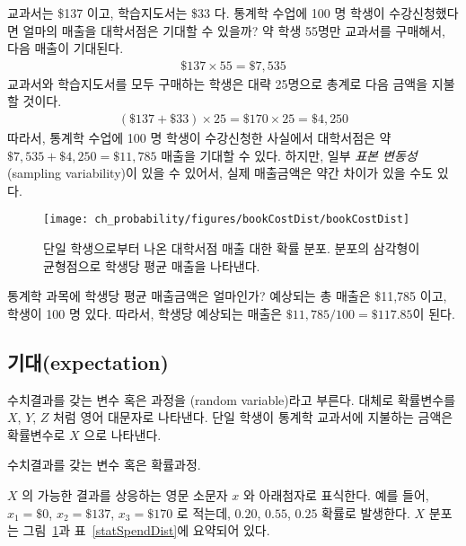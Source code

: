 \begin{example}{교과서는 \$137 이고, 학습지도서는 \$33 다. 통계학 수업에 100 명 학생이 수강신청했다면 얼마의 매출을 대학서점은 기대할 수 있을까?}\label{bookStoreRev}
약 학생 55명만 교과서를 구매해서, 다음 매출이 기대된다.
\begin{eqnarray*}
\$137 \times  55 = \$7,535
\end{eqnarray*}
교과서와 학습지도서를 모두 구매하는 학생은 대략 25명으로 총계로 다음 금액을 지불할 것이다.
\begin{eqnarray*}
(\$137 + \$33) \times  25 = \$170 \times  25 = \$4,250
\end{eqnarray*}
따라서, 통계학 수업에 100 명 학생이 수강신청한 사실에서 대학서점은 약 $\$7,535 + \$4,250 = \$11,785$ 매출을 기대할 수 있다. 하지만, 
일부 \emph{표본 변동성}(sampling variability)이 있을 수 있어서, 실제 매출금액은 약간 차이가 있을 수도 있다.
\end{example}

\begin{figure}[h]
\centering
\texttt{[image: ch\_probability/figures/bookCostDist/bookCostDist]}
\caption{단일 학생으로부터 나온 대학서점 매출 대한 확률 분포. 분포의 삼각형이 균형점으로 학생당 평균 매출을 나타낸다.}
\label{bookCostDist}
\end{figure}

\begin{example}{통계학 과목에 학생당 평균 매출금액은 얼마인가?}\label{revFromStudent}
예상되는 총 매출은 \$11,785 이고, 학생이 100 명 있다. 따라서, 학생당 예상되는 매출은 $\$11,785/100 =  \$117.85$이 된다.
\end{example}

\subsection{기대(expectation)}

수치결과를 갖는 변수 혹은 과정을 (random variable)라고 부른다. 대체로 확률변수를 $X$, $Y$, $Z$ 처럼 영어 대문자로 나타낸다. 단일 학생이 통계학 교과서에 지불하는 금액은 확률변수로 $X$ 으로 나타낸다.

\begin{termBox}{
수치결과를 갖는 변수 혹은 확률과정.}
\end{termBox}

$X$ 의 가능한 결과를 상응하는 영문 소문자 $x$ 와 아래첨자로 표식한다. 예를 들어, $x_1=\$0$, $x_2=\$137$, $x_3=\$170$ 로 적는데, $0.20$, $0.55$, $0.25$ 확률로 발생한다. $X$ 분포는 그림~\ref{bookCostDist}과 표~\ref{statSpendDist}에 요약되어 있다. 

